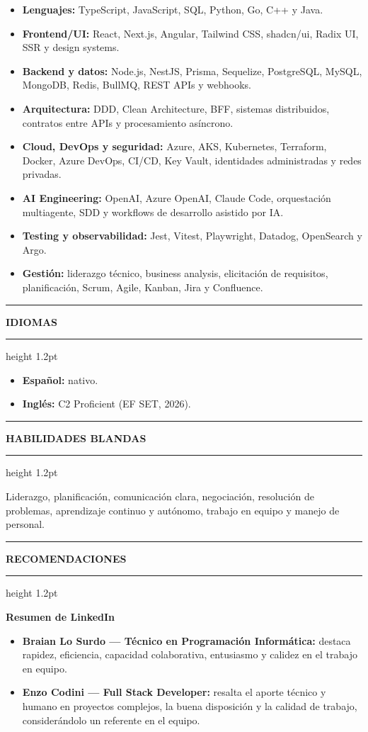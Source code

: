 \documentclass[11pt,letterpaper]{article}
\newcommand{\cvsection}[1]{%
  \Needspace{4\baselineskip}%
  \vspace{0.55em}%
  \noindent
  {\color{accent}\rule[-0.18em]{3pt}{1.25em}}%
  \hspace{0.45em}%
  {\large\bfseries\color{accentdark}\MakeUppercase{#1}}%
  \hspace{0.55em}%
  {\color{accentlight}\leaders\hrule height 1.2pt\hfill\kern0pt}\par
  \vspace{0.28em}%
}
\begin{document}
\begin{itemize}
  \item \textbf{Lenguajes:} TypeScript, JavaScript, SQL, Python, Go, C++ y Java.
  \item \textbf{Frontend/UI:} React, Next.js, Angular, Tailwind CSS, shadcn/ui, Radix UI,
    SSR y design systems.
  \item \textbf{Backend y datos:} Node.js, NestJS, Prisma, Sequelize, PostgreSQL, MySQL,
    MongoDB, Redis, BullMQ, REST APIs y webhooks.
  \item \textbf{Arquitectura:} DDD, Clean Architecture, BFF, sistemas distribuidos,
    contratos entre APIs y procesamiento asíncrono.
  \item \textbf{Cloud, DevOps y seguridad:} Azure, AKS, Kubernetes, Terraform, Docker,
    Azure DevOps, CI/CD, Key Vault, identidades administradas y redes privadas.
  \item \textbf{AI Engineering:} OpenAI, Azure OpenAI, Claude Code, orquestación
    multiagente, SDD y workflows de desarrollo asistido por IA.
  \item \textbf{Testing y observabilidad:} Jest, Vitest, Playwright, Datadog, OpenSearch
    y Argo.
  \item \textbf{Gestión:} liderazgo técnico, business analysis, elicitación de requisitos,
    planificación, Scrum, Agile, Kanban, Jira y Confluence.
\end{itemize}

\cvsection{Idiomas}

\begin{itemize}
  \item \textbf{Español:} nativo.
  \item \textbf{Inglés:} C2 Proficient (EF SET, 2026).
\end{itemize}

\cvsection{Habilidades blandas}

Liderazgo, planificación, comunicación clara, negociación, resolución de problemas,
aprendizaje continuo y autónomo, trabajo en equipo y manejo de personal.

\cvsection{Recomendaciones}

\textbf{Resumen de LinkedIn}
\begin{itemize}
  \item \textbf{Braian Lo Surdo --- Técnico en Programación Informática:} destaca rapidez,
    eficiencia, capacidad colaborativa, entusiasmo y calidez en el trabajo en equipo.
  \item \textbf{Enzo Codini --- Full Stack Developer:} resalta el aporte técnico y humano
    en proyectos complejos, la buena disposición y la calidad de trabajo, considerándolo
    un referente en el equipo.
\end{itemize}
\end{document}
